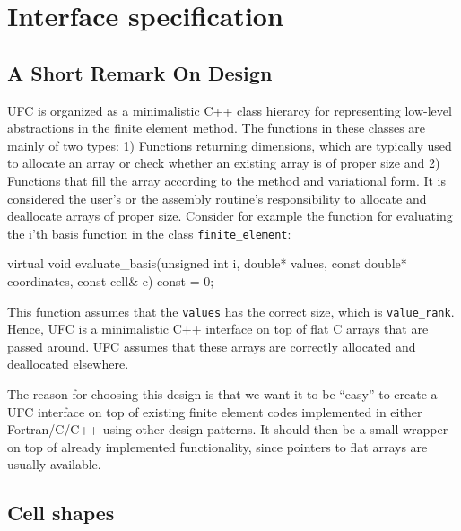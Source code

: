 \chapter{Interface specification}
\label{sec:interface}


\section{A Short Remark On Design}

UFC is organized as a minimalistic C++ class hierarcy
for representing low-level abstractions in the finite 
element method. The functions in these classes are mainly of
two types: 1) Functions returning dimensions,  which are typically 
used to allocate an array or check whether an existing array is of
proper size and 2) Functions that fill the array according to 
the method and variational form. It is considered the user's or
the assembly routine's responsibility to allocate and 
deallocate arrays of proper size. 
Consider for example the function for evaluating the i'th basis function 
in the class \texttt{finite\_element}:
\begin{code}
virtual void evaluate_basis(unsigned int i, double* values,
                            const double* coordinates,
                            const cell& c) const = 0;
\end{code}
This function assumes that the \texttt{values} has the 
correct size, which is \texttt{value\_rank}.  
Hence, UFC is a minimalistic C++ interface
on top of flat C arrays that are passed around. 
UFC assumes that these arrays are correctly allocated
and deallocated elsewhere. 

The reason for choosing this design is that we want it
to be ``easy'' to create a UFC interface on top of existing finite
element codes implemented in either Fortran/C/C++
using other design patterns. It 
should then be a small wrapper on top of already implemented
functionality, since pointers to flat arrays are usually available.


\section{Cell shapes}


